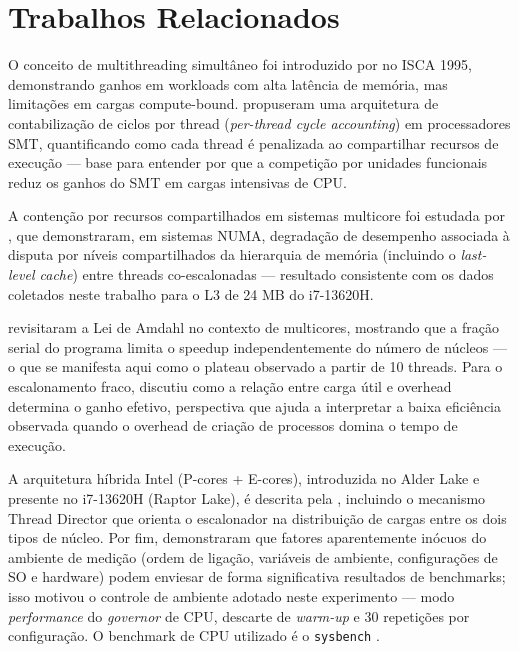 \documentclass[12pt]{article}
\begin{document}
\section{Trabalhos Relacionados}
\label{sec:related}

O conceito de multithreading simultâneo foi introduzido por \cite{tullsen1995}
no ISCA 1995, demonstrando ganhos em workloads com alta latência de memória,
mas limitações em cargas compute-bound. \cite{eyerman2009} propuseram uma
arquitetura de contabilização de ciclos por thread (\emph{per-thread cycle
accounting}) em processadores SMT, quantificando como cada thread é penalizada
ao compartilhar recursos de execução --- base para entender por que a
competição por unidades funcionais reduz os ganhos do SMT em cargas intensivas
de CPU.

A contenção por recursos compartilhados em sistemas multicore foi estudada por
\cite{blagodurov2011}, que demonstraram, em sistemas NUMA, degradação de
desempenho associada à disputa por níveis compartilhados da hierarquia de
memória (incluindo o \emph{last-level cache}) entre threads co-escalonadas ---
resultado consistente com os dados coletados neste trabalho para o L3 de 24 MB
do i7-13620H.

\cite{hill2008} revisitaram a Lei de Amdahl no contexto de multicores,
mostrando que a fração serial do programa limita o speedup independentemente do
número de núcleos --- o que se manifesta aqui como o plateau observado a partir
de 10 threads. Para o escalonamento fraco, \cite{gustafson1988} discutiu como a
relação entre carga útil e overhead determina o ganho efetivo, perspectiva que
ajuda a interpretar a baixa eficiência observada quando o overhead de criação
de processos domina o tempo de execução.

A arquitetura híbrida Intel (P-cores + E-cores), introduzida no Alder Lake e
presente no i7-13620H (Raptor Lake), é descrita pela \cite{intel2022},
incluindo o mecanismo Thread Director que orienta o escalonador na distribuição
de cargas entre os dois tipos de núcleo. Por fim, \cite{mytkowicz2009}
demonstraram que fatores aparentemente inócuos do ambiente de medição (ordem de
ligação, variáveis de ambiente, configurações de SO e hardware) podem enviesar
de forma significativa resultados de benchmarks; isso motivou o controle de
ambiente adotado neste experimento --- modo \emph{performance} do \emph{governor}
de CPU, descarte de \emph{warm-up} e 30 repetições por configuração. O benchmark
de CPU utilizado é o \texttt{sysbench} \cite{kopytov2020}.
\end{document}
